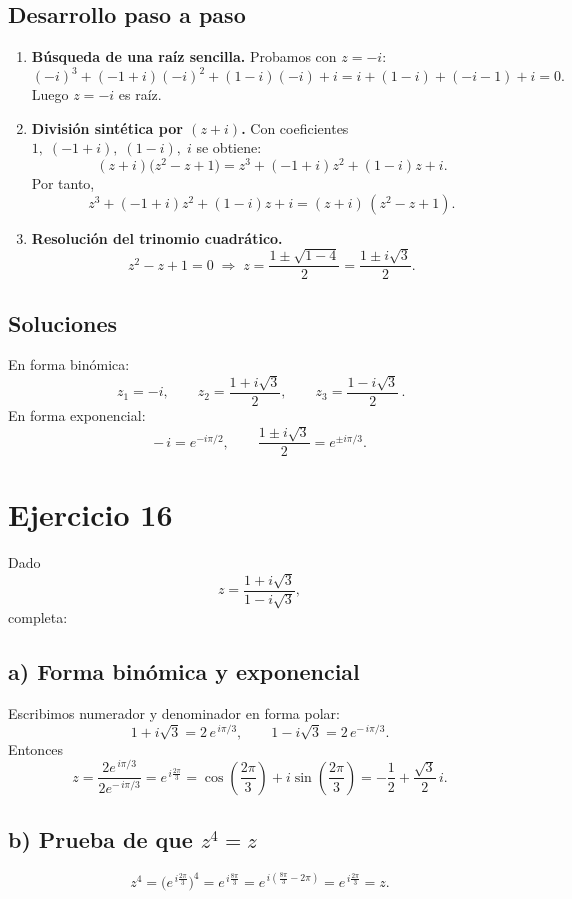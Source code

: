 \documentclass[fleqn]{article}
\begin{document}
\subsection*{Desarrollo paso a paso}
\begin{enumerate}
\item \textbf{Búsqueda de una raíz sencilla.} Probamos con $z=-i$:
\[
(-i)^3+(-1+i)(-i)^2+(1-i)(-i)+i
=i+(1-i)+(-i-1)+i=0.
\]
Luego $z=-i$ es raíz.

\item \textbf{División sintética por $(z+i)$.} Con coeficientes
\(
1,\;(-1+i),\;(1-i),\;i
\)
se obtiene:
\[
(z+i)\bigl(z^2- z+1\bigr)=
z^3+(-1+i)z^2+(1-i)z+i.
\]
Por tanto,
\[
z^3+(-1+i)z^2+(1-i)z+i=(z+i)\,(z^2-z+1).
\]

\item \textbf{Resolución del trinomio cuadrático.}
\[
z^2-z+1=0
\;\Longrightarrow\;
z=\frac{1\pm\sqrt{1-4}}{2}
=\frac{1\pm i\sqrt{3}}{2}.
\]
\end{enumerate}

\subsection*{Soluciones}
En forma binómica:
\[
\boxed{\,z_1=-i,\qquad z_2=\frac{1+i\sqrt{3}}{2},\qquad z_3=\frac{1-i\sqrt{3}}{2}\, }.
\]
En forma exponencial:
\[
-\,i=e^{-i\pi/2},\qquad 
\frac{1\pm i\sqrt{3}}{2}=e^{\pm i\pi/3}.
\]
\section*{Ejercicio 16}
Dado
\[
z=\frac{1+i\sqrt{3}}{1-i\sqrt{3}},
\]
completa:

\subsection*{a) Forma binómica y exponencial}
Escribimos numerador y denominador en forma polar:
\[
1+i\sqrt{3}=2\,e^{\,i\pi/3},\qquad
1-i\sqrt{3}=2\,e^{-\,i\pi/3}.
\]
Entonces
\[
z=\frac{2e^{\,i\pi/3}}{2e^{-\,i\pi/3}}=e^{\,i\frac{2\pi}{3}}
=\cos\!\left(\frac{2\pi}{3}\right)+i\sin\!\left(\frac{2\pi}{3}\right)
=-\frac12+\frac{\sqrt{3}}{2}\,i.
\]

\subsection*{b) Prueba de que $z^4=z$}
\[
z^4=\bigl(e^{\,i\frac{2\pi}{3}}\bigr)^4=e^{\,i\frac{8\pi}{3}}
=e^{\,i\left(\frac{8\pi}{3}-2\pi\right)}=e^{\,i\frac{2\pi}{3}}=z.
\]
\end{document}
